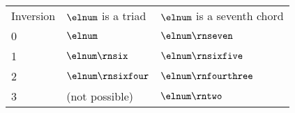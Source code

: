 \begin{tabular}{l|ll}
Inversion & $\elnum$ is a triad & $\elnum$ is a seventh chord \\
0 & $\elnum$ & $\elnum\rnseven$ \\
1 & $\elnum\rnsix$ & $\elnum\rnsixfive$ \\
2 & $\elnum\rnsixfour$ & $\elnum\rnfourthree$ \\
3 & (not possible) & $\elnum\rntwo$ \\
\end{tabular}
